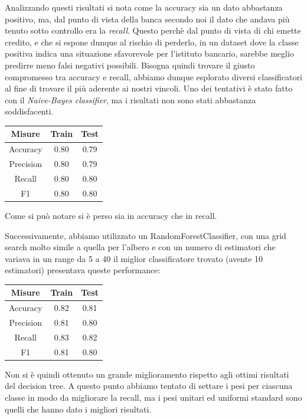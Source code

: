 Analizzando questi risultati si nota come la accuracy sia un 
dato abbastanza positivo, ma, dal punto di vista della banca 
secondo noi il dato che andava pi\`u tenuto sotto controllo
era la \textit{recall}. Questo perch\`e dal punto di vista
di chi emette credito, e che si espone dunque al rischio di
perderlo, in un dataset dove la classe positiva indica una situazione
sfavorevole per l'istituto bancario, sarebbe meglio predirre meno falsi
negativi possibili. Bisogna quindi trovare il giusto compromesso tra
accuracy e recall, abbiamo dunque esplorato diversi classificatori al fine
di trovare il pi\`u aderente ai nostri vincoli. 
Uno dei tentativi \`e stato fatto con il \textit{Naive-Bayes classifier}, ma
i risultati non sono stati abbastanza soddisfacenti.

\begin{center}
	\begin{tabular}{c|c|c}
		\hline
		\textbf{Misure} & \textbf{Train} & \textbf{Test}\\
		\hline
		Accuracy & 0.80 & 0.79\\
		\hline
		Precision & 0.80 & 0.79\\
		\hline
		Recall & 0.80 & 0.80\\
		\hline
		F1 & 0.80 & 0.80\\
		\hline
	\end{tabular}
\end{center}

Come si pu\`o notare si \`e perso sia in accuracy che in recall.

Successivamente, abbiamo utilizzato un RandomForestClassifier,
con una grid search molto simile a quella per l'albero e con
un numero di estimatori che variava in un range da 5 a 40 il miglior
classificatore trovato (avente 10 estimatori) presentava queste performance: 

\begin{center}
	\begin{tabular}{c|c|c}
		\hline
		\textbf{Misure} & \textbf{Train} & \textbf{Test}\\
		\hline
		Accuracy & 0.82 & 0.81\\
		\hline
		Precision & 0.81 & 0.80\\
		\hline
		Recall & 0.83 & 0.82\\
		\hline
		F1 & 0.81 & 0.80\\
		\hline
	\end{tabular}
\end{center}

Non si \`e quindi ottenuto un grande miglioramento rispetto
agli ottimi risultati del decision tree. A questo punto abbiamo
tentato di settare i pesi per ciascuna classe in modo da migliorare la
recall, ma i pesi unitari ed uniformi standard sono quelli che hanno
dato i migliori risultati.

